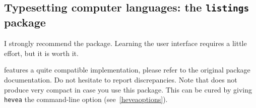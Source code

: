 \subsection{Typesetting \label{listings:package}computer languages: the \texttt{listings} package}
%
I strongly recommend the
 package.
Learning the user interface requires a little effort, but it is worth
it.

\hevea{} features a quite compatible implementation, please refer to
the original package documentation.
Do not hesitate to report discrepancies.
Note that \hevea{} does not produce very compact
\html{} in case you use this package.
This can be cured by
giving \texttt{hevea} the command-line option 
(see~\ref{heveaoptions}).

